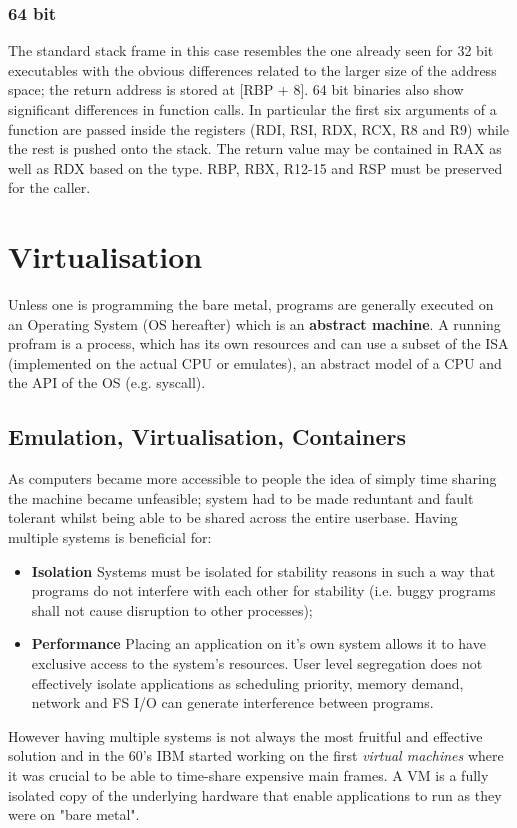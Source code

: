 \subsubsection{64 bit}
The standard stack frame in this case resembles the one already seen for 32 bit executables with the obvious differences
related to the larger size of the address space; the return address is stored at [{\ttfamily RBP + 8}]. 64 bit binaries
also show significant differences in function calls.
In particular the first six arguments of a function are passed inside the registers ({\ttfamily RDI}, {\ttfamily RSI},
{\ttfamily RDX}, {\ttfamily RCX}, {\ttfamily R8} and {\ttfamily R9}) while the rest is pushed onto the stack. The return
value may be contained in {\ttfamily RAX} as well as {\ttfamily RDX} based on the type. {\ttfamily RBP}, {\ttfamily
RBX}, {\ttfamily R12-15} and {\ttfamily RSP} must be preserved for the caller.



\section{Virtualisation} 
Unless one is programming the bare metal, programs are generally executed on an Operating System (OS hereafter) which 
is an \textbf{abstract machine}.  A running profram is a process, which has its own resources and can use a subset of 
the ISA (implemented on the actual CPU or emulates), an abstract model of a CPU and the API of the OS (e.g. syscall).
\subsection{Emulation, Virtualisation, Containers}
As computers became more accessible to people the idea of simply time sharing the machine became unfeasible; system had
to be made reduntant and fault tolerant whilst being able to be shared across the entire userbase. Having multiple
systems is beneficial for:
\begin{itemize} 
    \item \textbf{Isolation} Systems must be isolated for stability reasons in such a way that programs do not interfere
        with each other for stability (i.e. buggy programs shall not cause disruption to other processes);
    \item  \textbf{Performance} Placing an application on it's own system allows it to have exclusive access to the
        system's resources. User level segregation does not effectively isolate applications as scheduling priority,
        memory demand, network and FS I/O can generate interference between programs.  
\end{itemize} 
However having multiple systems is not always the most fruitful and effective solution and in the 60's IBM started
working on the first \textit{virtual machines} where it was crucial to be able to time-share expensive main frames.
A VM is a fully isolated copy of the underlying hardware that enable applications to run as they were on "bare metal".
